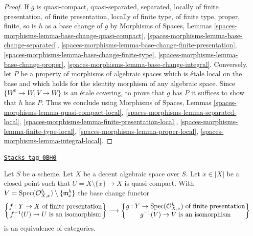 \begin{proof}
If $g$ is quasi-compact, quasi-separated, separated, locally of finite
presentation, of finite presentation, locally of finite type, of finite type,
proper, finite, so is $h$ as a base change of $g$ by
Morphisms of Spaces, Lemmas
\ref{spaces-morphisms-lemma-base-change-quasi-compact},
\ref{spaces-morphisms-lemma-base-change-separated},
\ref{spaces-morphisms-lemma-base-change-finite-presentation},
\ref{spaces-morphisms-lemma-base-change-finite-type},
\ref{spaces-morphisms-lemma-base-change-proper},
\ref{spaces-morphisms-lemma-base-change-integral}.
Conversely, let $P$ be a property of morphisms of algebraic
spaces which is \'etale local on the base and which holds for
the identity morphism of any algebraic space.
Since $\{W^0 \to W, V \to W\}$ is an \'etale
covering, to prove that $g$ has $P$ it suffices to show
that $h$ has $P$. Thus we conclude using
Morphisms of Spaces, Lemmas
\ref{spaces-morphisms-lemma-quasi-compact-local},
\ref{spaces-morphisms-lemma-separated-local},
\ref{spaces-morphisms-lemma-finite-presentation-local},
\ref{spaces-morphisms-lemma-finite-type-local},
\ref{spaces-morphisms-lemma-proper-local},
\ref{spaces-morphisms-lemma-integral-local}.
\end{proof}

\begin{lemma}[Modifications]
\label{spaces-limits-lemma-modifications}
\href{https://stacks.math.columbia.edu/tag/0BH0}{\texttt{Stacks tag 0BH0}}

Let $S$ be a scheme. Let $X$ be a decent algebraic space over $S$.
Let $x \in |X|$ be a closed point such that $U = X \setminus \{x\} \to X$
is quasi-compact. With
$V = \operatorname{Spec}(\mathcal{O}_{X, x}^h) \setminus \{\mathfrak m_x^h\}$
the base change functor
$$
\left\{
\begin{matrix}
f : Y \to X\text{ of finite presentation} \\
f^{-1}(U) \to U\text{ is an isomorphism}
\end{matrix}
\right\}
\longrightarrow
\left\{
\begin{matrix}
g : Y \to \operatorname{Spec}(\mathcal{O}_{X, x}^h)\text{ of finite presentation} \\
g^{-1}(V) \to V\text{ is an isomorphism}
\end{matrix}
\right\}
$$
is an equivalence of categories.
\end{lemma}

